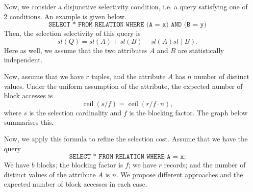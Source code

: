\documentclass[a4paper, openany]{memoir}
\theoremstyle{definition}
\theoremstyle{plain}
\begin{document}
Now, we consider a disjunctive selectivity condition, i.e. a query satisfying one of 2 conditions. An example is given below.
\[\texttt{SELECT * FROM RELATION WHERE (A = x) AND (B = y)}\]
Then, the selection selectivity of this query is
\[\textit{sl}(Q) = \textit{sl}(A) + \textit{sl}(B) - \textit{sl}(A) \textit{sl}(B).\]
Here as well, we assume that the two attributes $A$ and $B$ are statistically independent.

Now, assume that we have $r$ tuples, and the attribute $A$ has $n$ number of distinct values. Under the uniform assumption of the attribute, the expected number of block accesses is
\[\operatorname{ceil}(s/f) = \operatorname{ceil}(r/f \cdot n),\]
where $s$ is the selection cardinality and $f$ is the blocking factor. The graph below summarises this.

Now, we apply this formula to refine the selection cost. Assume that we have the query
\[\texttt{SELECT * FROM RELATION WHERE A = x;}\]
We have $b$ blocks; the blocking factor is $f$; we have $r$ records; and the number of distinct values of the attribute $A$ is $n$. We propose different approaches and the expected number of block accesses in each case.
\end{document}
